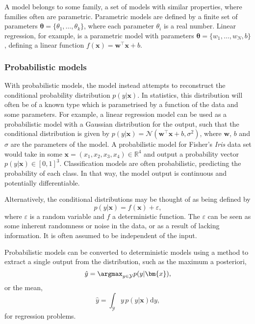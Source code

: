 A model belongs to some family, a set of models with similar properties, where families often are parametric.
Parametric models are defined by a finite set of parameters $\bm{\theta}= \{\theta_1, \ldots, \theta_k\}$, where each parameter $\theta_i$ is a real number.
Linear regression, for example, is a parametric model with parameters $\bm{\theta} = \{w_1, \ldots, w_N, b\}$, defining a linear function $f(\bm{x}) = \bm{w}^\top\bm{x} + b$.

\subsubsection{Probabilistic models}
With probabilistic models, the model instead attempts to reconstruct the conditional probability distribution $p(y|\bm{x})$.
In statistics, this distribution will often be of a known type which is parametrised by a function of the data and some parameters.
For example, a linear regression model can be used as a probabilistic model with a Gaussian distribution for the output, such that the conditional distribution is given by $p(y|\bm{x}) = \mathcal{N}(\bm{w}^\top\bm{x} + b, \sigma^2)$, where $\bm{w}$, $b$ and $\sigma$ are the parameters of the model. A probabilistic model for Fisher's \textit{Iris} data set would take in some $\bm{x}=(x_1,x_2,x_3,x_4)\in\mathbb{R}^4$ and output a probability vector $p(y|\bm{x})\in [0,1]^3$.
Classification models are often probabilistic, predicting the probability of each class.
In that way, the model output is continuous and potentially differentiable.

Alternatively, the conditional distributions may be thought of as being defined by
\begin{equation}
    p(y|\bm{x}) = f(\bm{x}) + \varepsilon,
    \label{eq:probabilistic_model}
\end{equation}
where $\varepsilon$ is a random variable and $f$ a deterministic function.
The $\varepsilon$ can be seen as some inherent randomness or noise in the data, or as a result of lacking information.
It is often assumed to be independent of the input.

Probabilistic models can be converted to deterministic models using a method to extract a single output from the distribution, such as the maximum a posteriori,
\begin{equation}
    \hat{y} = \argmax_{y\in\mathcal{Y}} p(y|\bm{x}),
\end{equation}
or the mean,
\begin{equation}
    \hat{y} = \int_{\mathcal{Y}} y \, p(y|\bm{x})\mathrm{d}y,
\end{equation}
for regression problems.

